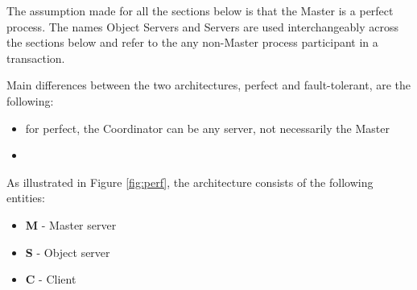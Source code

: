 \documentclass[times, 10pt,twocolumn]{article}
\begin{document}
\label{sec:arch}

The assumption made for all the sections below is that the Master is a perfect process. The names Object Servers and Servers are used interchangeably across the sections below and refer to the any non-Master process participant in a transaction.

Main differences between the two architectures, perfect and fault-tolerant, are the following:
\begin{itemize}[noitemsep,nolistsep]
\item for perfect, the Coordinator can be any server, not necessarily the Master
\item 
\end{itemize}

\label{subsec:perf}
As illustrated in Figure \ref{fig:perf}, the architecture consists of the 
following entities: 
\begin{itemize}[noitemsep,nolistsep]
\item {\bf M} - Master server 
\item {\bf S} - Object server
\item {\bf C} - Client      
\end{itemize}
\end{document}

